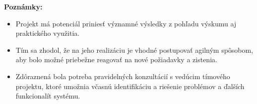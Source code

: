 \vspace{0.5cm}
\textbf{Poznámky:}
\begin{itemize}
    \item Projekt má potenciál priniesť významné výsledky z pohľadu výskumu aj praktického využitia.
    \item Tím sa zhodol, že na jeho realizáciu je vhodné postupovať agilným spôsobom, aby bolo možné priebežne reagovať na nové požiadavky a zistenia.
    \item Zdôraznená bola potreba pravidelných konzultácií s vedúcim tímového projektu, ktoré umožnia včasnú identifikáciu a riešenie problémov a ďalších funkcionalít systému.
\end{itemize}
